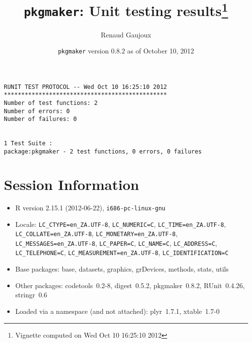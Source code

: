 \documentclass[10pt]{article}
\author{Renaud Gaujoux}
\title{\texttt{pkgmaker}: Unit testing results\footnote{Vignette computed  on Wed Oct 10 16:25:10 2012}}
\date{\texttt{pkgmaker} version 0.8.2 as of October 10, 2012}
\begin{document}
\maketitle

\begin{verbatim}
RUNIT TEST PROTOCOL -- Wed Oct 10 16:25:10 2012 
*********************************************** 
Number of test functions: 2 
Number of errors: 0 
Number of failures: 0 

 
1 Test Suite : 
package:pkgmaker - 2 test functions, 0 errors, 0 failures
\end{verbatim}

\section*{Session Information}
\begin{itemize}\raggedright
  \item R version 2.15.1 (2012-06-22), \verb|i686-pc-linux-gnu|
  \item Locale: \verb|LC_CTYPE=en_ZA.UTF-8|, \verb|LC_NUMERIC=C|, \verb|LC_TIME=en_ZA.UTF-8|, \verb|LC_COLLATE=en_ZA.UTF-8|, \verb|LC_MONETARY=en_ZA.UTF-8|, \verb|LC_MESSAGES=en_ZA.UTF-8|, \verb|LC_PAPER=C|, \verb|LC_NAME=C|, \verb|LC_ADDRESS=C|, \verb|LC_TELEPHONE=C|, \verb|LC_MEASUREMENT=en_ZA.UTF-8|, \verb|LC_IDENTIFICATION=C|
  \item Base packages: base, datasets, graphics, grDevices, methods,
    stats, utils
  \item Other packages: codetools~0.2-8, digest~0.5.2, pkgmaker~0.8.2,
    RUnit~0.4.26, stringr~0.6
  \item Loaded via a namespace (and not attached): plyr~1.7.1,
    xtable~1.7-0
\end{itemize}
\end{document}
